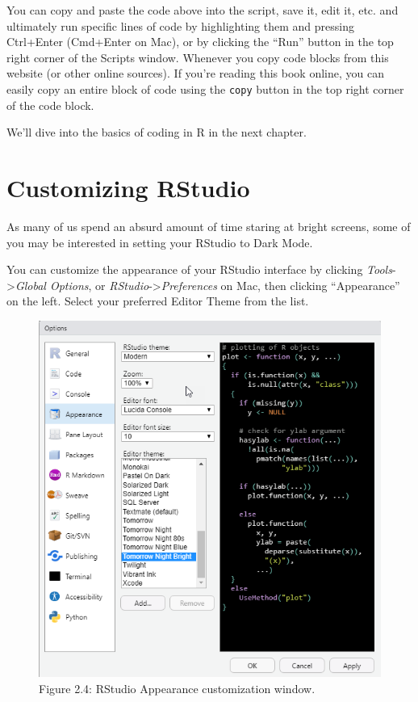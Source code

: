 \documentclass[
]{book}
\begin{document}
You can copy and paste the code above into the script, save it, edit it, etc. and ultimately run specific lines of code by highlighting them and pressing Ctrl+Enter (Cmd+Enter on Mac), or by clicking the ``Run'' button in the top right corner of the Scripts window. Whenever you copy code blocks from this website (or other online sources). If you're reading this book online, you can easily copy an entire block of code using the \texttt{copy} button in the top right corner of the code block.

We'll dive into the basics of coding in R in the next chapter.

\hypertarget{customizing-rstudio}{%
\section{Customizing RStudio}\label{customizing-rstudio}}

As many of us spend an absurd amount of time staring at bright screens, some of you may be interested in setting your RStudio to Dark Mode.

You can customize the appearance of your RStudio interface by clicking \emph{Tools}-\textgreater{}\emph{Global Options}, or \emph{RStudio}-\textgreater{}\emph{Preferences} on Mac, then clicking ``Appearance'' on the left. Select your preferred Editor Theme from the list.

\begin{figure}
\centering
\includegraphics[width=1\textwidth,height=\textheight]{images/Rstudio_darkthemes.png}
\caption{Figure 2.4: RStudio Appearance customization window.}
\end{figure}
\end{document}
